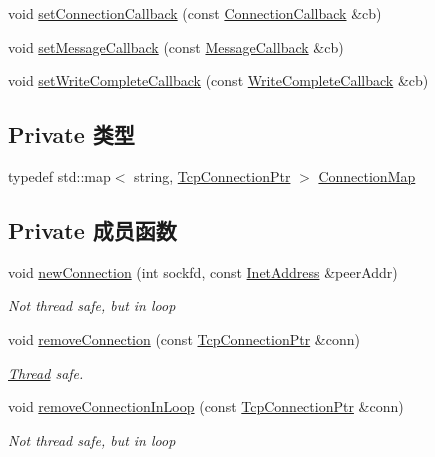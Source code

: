 \begin{DoxyCompactItemize}
void \hyperlink{classmuduo_1_1net_1_1TcpServer_abbb0008856a8495adb08c8cb7fe65c2c}{set\+Connection\+Callback} (const \hyperlink{namespacemuduo_1_1net_a78754792e997a13cb10908eb7ec508b2}{Connection\+Callback} \&cb)
\item 
void \hyperlink{classmuduo_1_1net_1_1TcpServer_a0a67f11f92b4cdc6f6c66b861f81cb08}{set\+Message\+Callback} (const \hyperlink{namespacemuduo_1_1net_acaa802028467a41738aeb49699e85285}{Message\+Callback} \&cb)
\item 
void \hyperlink{classmuduo_1_1net_1_1TcpServer_a94b31be320453fc8aeae81b25934b43f}{set\+Write\+Complete\+Callback} (const \hyperlink{namespacemuduo_1_1net_a525c3730bfefb763975b035ebc88a63d}{Write\+Complete\+Callback} \&cb)
\end{DoxyCompactItemize}
\subsection*{Private 类型}
\begin{DoxyCompactItemize}
\item 
typedef std\+::map$<$ string, \hyperlink{namespacemuduo_1_1net_ab91a46e9290926aa692450e46cfc9039}{Tcp\+Connection\+Ptr} $>$ \hyperlink{classmuduo_1_1net_1_1TcpServer_a2c3bfe5c78908785dcee50683b157116}{Connection\+Map}
\end{DoxyCompactItemize}
\subsection*{Private 成员函数}
\begin{DoxyCompactItemize}
\item 
void \hyperlink{classmuduo_1_1net_1_1TcpServer_a6e7510f45cfa67ddc79aa8689fd79562}{new\+Connection} (int sockfd, const \hyperlink{classmuduo_1_1net_1_1InetAddress}{Inet\+Address} \&peer\+Addr)
\begin{DoxyCompactList}\small\item\em Not thread safe, but in loop \end{DoxyCompactList}\item 
void \hyperlink{classmuduo_1_1net_1_1TcpServer_ad9661c3f05443256c9439f812d1a7691}{remove\+Connection} (const \hyperlink{namespacemuduo_1_1net_ab91a46e9290926aa692450e46cfc9039}{Tcp\+Connection\+Ptr} \&conn)
\begin{DoxyCompactList}\small\item\em \hyperlink{classmuduo_1_1Thread}{Thread} safe. \end{DoxyCompactList}\item 
void \hyperlink{classmuduo_1_1net_1_1TcpServer_a38345725075c2bf845af025c2567d977}{remove\+Connection\+In\+Loop} (const \hyperlink{namespacemuduo_1_1net_ab91a46e9290926aa692450e46cfc9039}{Tcp\+Connection\+Ptr} \&conn)
\begin{DoxyCompactList}\small\item\em Not thread safe, but in loop \end{DoxyCompactList}\end{DoxyCompactItemize}

